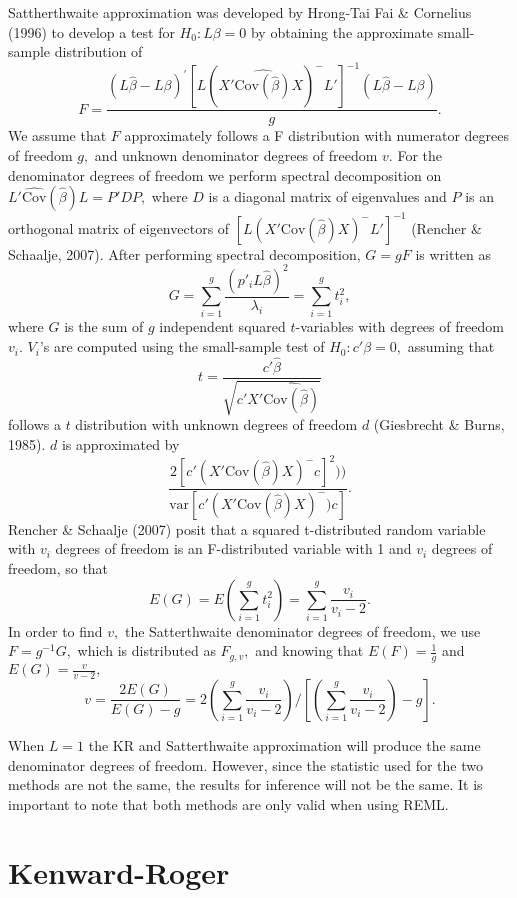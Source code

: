 \documentclass[12pt, twoside]{amherstthesis}
\begin{document}
Sattherthwaite approximation was developed by Hrong-Tai Fai \& Cornelius (1996) to develop a test for \(H_0:L\beta = 0\) by obtaining the approximate small-sample distribution of \[F = \frac{(L\hat\beta-L\beta)^{'}[L(X' \widehat{\text{Cov}(\hat\beta)}X)^-L']^{-1}(L\hat\beta-L\beta)}{g}.\] We assume that \(F\) approximately follows a F distribution with numerator degrees of freedom \(g,\) and unknown denominator degrees of freedom \(v.\) For the denominator degrees of freedom we perform spectral decomposition on \(L'\widehat {\text{Cov}}(\hat\beta) L=P'DP,\) where \(D\) is a diagonal matrix of eigenvalues and \(P\) is an orthogonal matrix of eigenvectors of \([L(X' \text{Cov}(\hat\beta)X)^-L']^{-1}\) (Rencher \& Schaalje, 2007). After performing spectral decomposition, \(G = gF\) is written as \[G = \sum_{i=1}^{g}\frac{(p'_iL\hat\beta)^2}{\lambda_i} = \sum_{i=1}^{g}t_i^2,\] where \(G\) is the sum of \(g\) independent squared \(t\)-variables with degrees of freedom \(v_i.\) \(V_i\)'s are computed using the small-sample test of \(H_0: c'\beta=0,\) assuming that \[ t = \frac{c'\hat\beta}{\sqrt{c'X'\widehat{\text{Cov}(\hat\beta)}}}\] follows a \(t\) distribution with unknown degrees of freedom \(d\) (Giesbrecht \& Burns, 1985). \(d\) is approximated by \[\frac{2[c'(X'\text{Cov}(\hat\beta)X)^-c]^2))}{\text{var}[c'(X'\text{Cov}(\hat\beta)X)^-)c]}.\] Rencher \& Schaalje (2007) posit that a squared t-distributed random variable with \(v_i\) degrees of freedom is an F-distributed variable with 1 and \(v_i\) degrees of freedom, so that \[E(G) = E(\sum_{i=1}^{g}t_i^2) = \sum_{i=1}^{g} \frac{v_i}{v_i-2}.\] In order to find \(v,\) the Satterthwaite denominator degrees of freedom, we use \(F = g^{-1}G,\) which is distributed as \(F_{g,v},\) and knowing that \(E(F) = \frac{1}{g}\) and \(E(G) = \frac{v}{v-2},\) \[v = \frac{2E(G)}{E(G)-g} = 2(\sum_{i=1}^{g}\frac{v_i}{v_i-2})/[(\sum_{i=1}^{g}\frac{v_i}{v_i-2})-g].\]

When \(L =1\) the KR and Satterthwaite approximation will produce the same denominator degrees of freedom. However, since the statistic used for the two methods are not the same, the results for inference will not be the same. It is important to note that both methods are only valid when using REML.

\hypertarget{kenward-roger}{%
\section{Kenward-Roger}\label{kenward-roger}}
\end{document}

